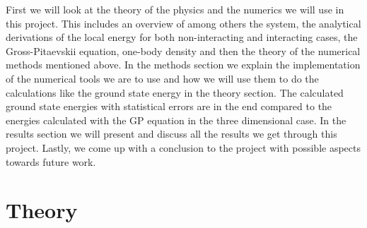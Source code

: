 \documentclass[12pt,a4paper,english]{article}
\begin{document}
First we will look at the theory of the physics and the numerics we will use in this project. This includes an overview of among others the system, the analytical derivations of the local energy for both non-interacting and interacting cases, the Gross-Pitaevskii equation, one-body density and then the theory of the numerical methods mentioned above. In the methods section we explain the implementation of the numerical tools we are to use and how we will use them to do the calculations like the ground state energy in the theory section. The calculated ground state energies with statistical errors are in the end compared to the energies calculated with the GP equation in the three dimensional case. In the results section we will present and discuss all the results we get through this project. Lastly, we come up with a conclusion to the project with possible aspects towards future work.

\section{Theory}
\label{sect:Theory}
\end{document}

